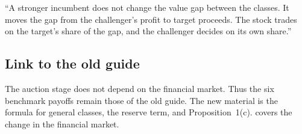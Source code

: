 \begin{panelnote}
``A stronger incumbent does not change the value gap between the classes. It moves the gap from the
challenger's profit to target proceeds. The stock trades on the target's share of the gap, and the
challenger decides on its own share.''
\end{panelnote}

\subsection{Link to the old guide}\label{sec:03_auction-laplace}

The auction stage does not depend on the financial market.
Thus the six benchmark payoffs remain those of the old guide.
The new material is the formula for general classes, the reserve term, and Proposition~1(c).
 covers the change in the financial market.
